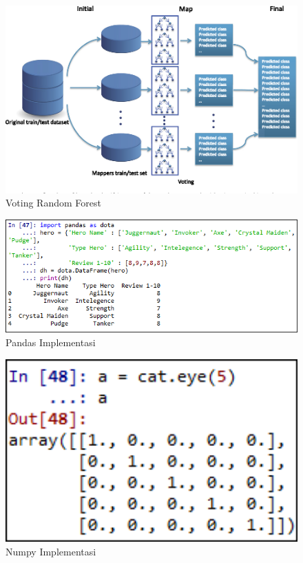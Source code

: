 \begin{figure}[ht]
	\centerline{\includegraphics[width=1\textwidth]{figures/fathi/chapter3/hari1/3.png}}
	\caption{Voting Random Forest}
	\label{fig3}
\end{figure}

\begin{figure}[ht]
	\centerline{\includegraphics[width=1\textwidth]{figures/fathi/chapter3/hari2/1.png}}
	\caption{Pandas Implementasi}
	\label{pandas}
\end{figure}

\begin{figure}[ht]
	\centerline{\includegraphics[width=1\textwidth]{figures/fathi/chapter3/hari2/21.png}}
	\caption{Numpy Implementasi}
	\label{numpy1}
\end{figure}

